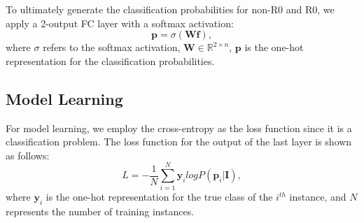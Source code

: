 To ultimately generate the classification probabilities for non-R0 and R0, we apply a 2-output FC layer with a softmax activation:
\begin{equation}
\bm{p} = \sigma(\bm{W}\bm{f}),
\end{equation}
where $\sigma$ refers to the softmax activation, $\bm{W} \in \mathbb{R}^{2 \times n}$, $\bm{p}$ is the one-hot representation for the classification probabilities.

\subsection{Model Learning}
For model learning, 
we employ the cross-entropy as the loss function since it is a classification problem.
The loss function for the output of the last layer is shown as follows:
\begin{equation}
L = -\frac{1}{N}\sum_{i=1}^{N}\bm{y}_ilogP(\bm{p}_i|\bm{I}),
\end{equation}
where $\bm{y}_i$ is the one-hot representation for the true class of the $i^{th}$ instance, and $N$ represents the number of training instances.